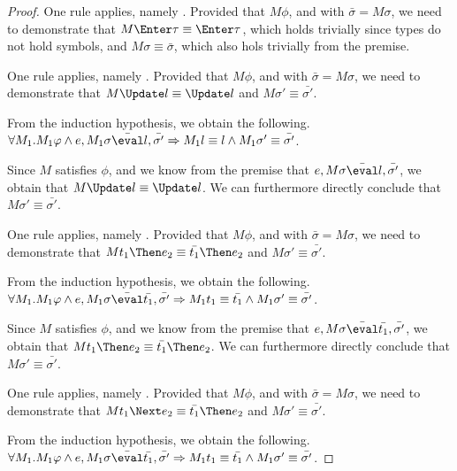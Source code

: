 \begin{proof}
  {
  One rule applies, namely .
  Provided that $M\phi$, and  with $\bar{\sigma}=M\sigma$,
  we need to demonstrate that $M \Enter \tau \equiv \Enter \tau$, which holds trivially since types do not hold symbols,
  and $M\sigma\equiv\bar{\sigma}$, which also hols trivially from the premise.
  }

  {One rule applies, namely .
  Provided that $M\phi$, and  with $\bar{\sigma}=M\sigma$,
  we need to demonstrate that $M \Update l \equiv \Update l$ and $M\sigma'\equiv\bar{\sigma'}$.

  From the induction hypothesis, we obtain the following. $\forall M_1 .  M_1\phi \land e, M_1\sigma \bar{\eval}l,\bar{\sigma'}\implies  M_1 l\equiv l \land  M_1\sigma'\equiv\bar{\sigma'}$.

  Since $M$ satisfies $\phi$,
  and we know from the premise that $e,M\sigma \bar{\eval}l,\bar{\sigma'}$,
  we obtain that $M \Update l\equiv \Update l$.
  We can furthermore directly conclude that $M \sigma' \equiv\bar{\sigma'}$.

  }

  {One rule applies, namely .
  Provided that $M\phi$, and  with $\bar{\sigma}=M\sigma$,
  we need to demonstrate that $M t_1\Then e_2 \equiv \bar{t_1}\Then e_2$ and $M\sigma'\equiv\bar{\sigma'}$.

  From the induction hypothesis, we obtain the following. $\forall M_1 .  M_1\phi \land e, M_1\sigma \bar{\eval}\bar{t_1},\bar{\sigma'}\implies  M_1 t_1\equiv \bar{t_1} \land  M_1\sigma'\equiv\bar{\sigma'}$.

  Since $M$ satisfies $\phi$,
  and we know from the premise that $e,M\sigma \bar{\eval}\bar{t_1},\bar{\sigma'}$,
  we obtain that $M t_1\Then e_2 \equiv \bar{t_1}\Then e_2$.
  We can furthermore directly conclude that $M \sigma' \equiv\bar{\sigma'}$.

  }

  {One rule applies, namely .
  Provided that $M\phi$, and  with $\bar{\sigma}=M\sigma$,
  we need to demonstrate that $M t_1\Next e_2 \equiv \bar{t_1}\Then e_2$ and $M\sigma'\equiv\bar{\sigma'}$.

  From the induction hypothesis, we obtain the following. $\forall M_1 .  M_1\phi \land e, M_1\sigma \bar{\eval}\bar{t_1},\bar{\sigma'}\implies  M_1 t_1\equiv \bar{t_1} \land  M_1\sigma'\equiv\bar{\sigma'}$.

}
\end{proof}
